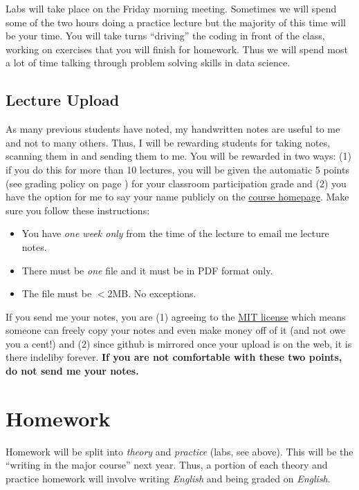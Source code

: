 \documentclass[12pt]{article}
\newcommand{\inred}[1]{\color{red}\textbf{#1} \color{black}}
\newcommand{\coursewebpage}{\href{https://github.com/kapelner/QC_Math_390.4_Spring_2020}{course homepage}}
\newcommand{\qu}[1]{``#1''}
\begin{document}
Labs will take place on the Friday morning meeting. Sometimes we will spend some of the two hours doing a practice lecture but the majority of this time will be your time. You will take turns \qu{driving} the coding in front of the class, working on exercises that you will finish for homework. Thus we will spend most a lot of time talking through problem solving skills in data science.


\subsection*{Lecture Upload}

As many previous students have noted, my handwritten notes are useful to me and not to many others. Thus, I will be rewarding students for taking notes, scanning them in and sending them to me. You will be rewarded in two ways: (1) if you do this for more than 10 lectures, you will be given the automatic 5 points (see grading policy on page \pageref{sec:grading}) for your classroom participation grade and (2) you have the option for me to say your name publicly on the \coursewebpage. Make sure you follow these instructions:

\begin{itemize}
\item You have \emph{one week only} from the time of the lecture to email me lecture notes.
\item There must be \emph{one} file and it must be in PDF format only.
\item The file must be $<$2MB. No exceptions.
\end{itemize}

If you send me your notes, you are (1) agreeing to the \href{https://github.com/kapelner/QC_Math_390.4_Spring_2020/blob/master/LICENSE}{MIT license} which means someone can freely copy your notes and even make money off of it (and not owe you a cent!) and (2) since github is mirrored once your upload is on the web, it is there indeliby forever. \inred{If you are not comfortable with these two points, do not send me your notes.}

\section*{Homework}

Homework will be split into \textit{theory} and \textit{practice} (labs, see above). This will be the \qu{writing in the major course} next year. Thus, a portion of each theory and practice homework will involve writing \textit{English} and being graded on \textit{English}.
\end{document}
